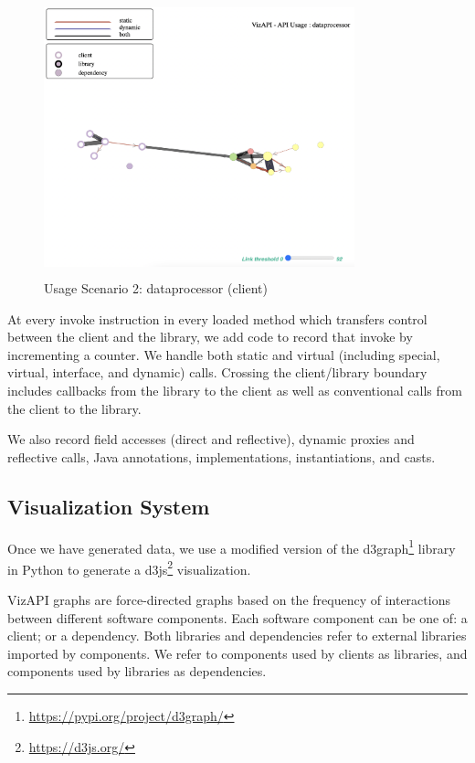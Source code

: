 \begin{figure}[t]
\begin{center}
\includegraphics[scale=1,width=9cm,height=8cm]{images/usage-scenario2.png}
\caption{Usage Scenario 2: dataprocessor (client)}
\label{fig:usagescenario2}
\end{center}
\end{figure}

At every invoke instruction in every
loaded method which transfers control between the client and the
library, we add code to record that invoke by incrementing a counter.
We handle both static and virtual (including special, virtual,
interface, and dynamic) calls. Crossing the client/library boundary
includes callbacks from the library to the client as well as conventional
calls from the client to the library. 

We also record field accesses (direct and reflective), dynamic proxies
and reflective calls, Java annotations, implementations,
instantiations, and casts.

\subsection{Visualization System}
\label{subsec:vis-system}

Once we have generated data, we use a modified version
of the d3graph\footnote{\url{https://pypi.org/project/d3graph/}} library in Python to generate a d3js\footnote{\url{https://d3js.org/}}
visualization. 

VizAPI graphs are force-directed graphs based on the
frequency of interactions between different software components. 
Each software component can be one of: a client; or a dependency.
Both libraries and dependencies refer to external libraries imported by components.
We refer to components used by clients as libraries, and components used by libraries
as dependencies. 

